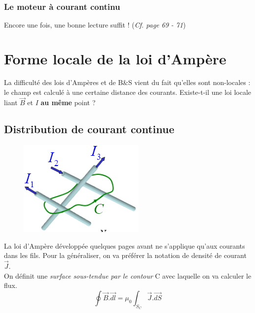 \documentclass	[11pt, a4paper, openany]{book}
\begin{document}
\subsubsection{Le moteur à courant continu}
Encore une fois, une bonne lecture suffit ! (\textit{Cf. page 69 - 71})

\section{Forme locale de la loi d'Ampère}
La difficulté des lois d'Ampères et de B\&S vient du fait qu'elles sont non-locales : le champ est calculé à une certaine distance des courants. Existe-t-il une loi locale liant $\vec{B}$ et $I$ \textbf{au même} point ?

\subsection{Distribution de courant continue}
\begin{figure}
\includegraphics[scale=0.50]{magneto/image15.png}
\end{figure}

La loi d'Ampère développée quelques pages avant ne s'applique qu'aux courants dans les fils. Pour la généraliser, on va préférer la notation de densité de courant $\vec{J}$.\\





On définit une \textit{surface sous-tendue par le contour} C avec laquelle on va calculer le flux.
\begin{equation}
\oint \vec{B}.\vec{dl} = \mu_0 \int_{S_C} \vec{J}.\vec{dS}
\end{equation}
\end{document}
